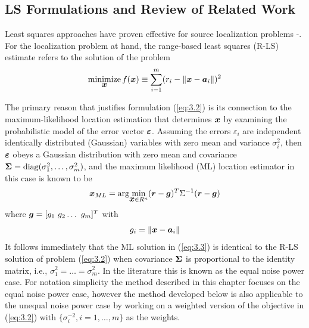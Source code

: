 \subsection{LS Formulations and Review of Related Work} %

Least squares approaches have proven effective for source localization problems \cite{SmithAbel} -\cite{BeckStLi}. For the localization problem at hand, the range-based least squares (R-LS) estimate refers to the solution of the problem
\begin{equation}\label{eq:3.2} %
\Min_{\Bx} f(\Bx) \equiv \sum_{i=1}^{m} (r_i - \|{\Bx} - {\Ba}_i\|)^2
\end{equation}

The primary reason that justifies formulation (\ref{eq:3.2}) is its connection to the maximum-likelihood location estimation that determines $\mbox{\boldmath$x$}$ by examining the probabilistic model of the error vector $\mbox{\boldmath${\varepsilon}$}$. Assuming the errors $\varepsilon_i$ are independent identically distributed (Gaussian) variables with zero mean and variance $\sigma_i^2$, then $\mbox{\boldmath${\varepsilon}$}$ obeys a Gaussian distribution with zero mean and covariance $\mbox{\boldmath${\Sigma}$} = \mbox{diag}(\sigma_1^2, \ldots, \sigma_m^2)$, and the maximum likelihood (ML) location estimator in this case is known to be
\begin{equation} \label{eq:3.3}%
\Bx_{ML} = \mbox{arg}\!\min_{{\Bx} \in R^n} (\Br - \Bg)^T\Sigma^{-1}(\Br - \Bg)
\end{equation}
where $\mbox{\boldmath$g$} = [g_1 \ g_2 \ldots \ g_m]^T$ with
\begin{equation} \label{eq:3.4}%
g_i = \|{\Bx} - {\Ba}_i\|
\end{equation}
It follows immediately that the ML solution in (\ref{eq:3.3}) is identical to the R-LS solution of problem (\ref{eq:3.2}) when covariance $\mbox{\boldmath${\Sigma}$}$ is proportional to the identity matrix, i.e., $\sigma_1^2=\ldots =\sigma_m^2$. In the literature this is known as the equal noise power case. For notation simplicity the method described in this chapter focuses on the equal noise power case, however the method developed below is also applicable to the unequal noise power case by working on a weighted version of the objective in  (\ref{eq:3.2})  with $\{\sigma_i^{-2}, i = 1, \ldots, m\}$ as the weights.

